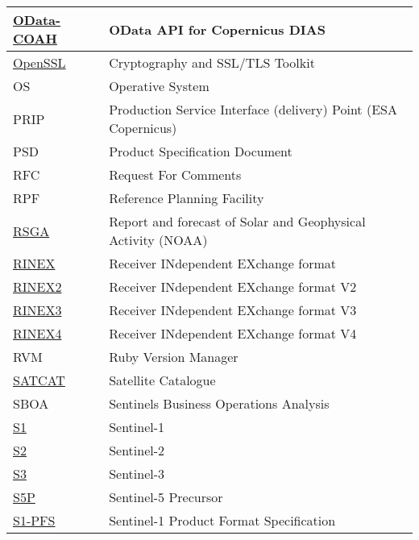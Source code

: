 \documentclass[dec_sum_main.tex]{subfiles}
\begin{document}
\begin{longtable}{|m{2.8cm}|m{10cm}|}
    \href{https://scihub.copernicus.eu/twiki/do/view/SciHubUserGuide/ODataAPI?redirectedfrom=SciHubUserGuide.7ODataAPI}{OData-COAH} & OData API for Copernicus DIAS \\ \hline
    \href{https://wiki.openssl.org/index.php/Main_Page}{OpenSSL} & Cryptography and SSL/TLS Toolkit \\ \hline    
	OS & Operative System \\ \hline
	PRIP & Production Service Interface (delivery) Point (ESA Copernicus) \\ \hline
    PSD & Product Specification Document \\ \hline
	RFC & Request For Comments \\ \hline
	RPF & Reference Planning Facility \\ \hline
	\href{https://www.swpc.noaa.gov/products/solar-and-geophysical-activity-summary}{RSGA} & Report and forecast of Solar and Geophysical Activity  (NOAA)\\ \hline
	\href{https://www.igs.org/wg/rinex/#documents-formats}{RINEX} & Receiver INdependent EXchange format \\ \hline
	\href{https://files.igs.org/pub/data/format/rinex211.txt}{RINEX2} & Receiver INdependent EXchange format V2 \\ \hline
	\href{https://files.igs.org/pub/data/format/rinex305.pdf}{RINEX3} & Receiver INdependent EXchange format V3 \\ \hline
	\href{https://files.igs.org/pub/data/format/rinex_4.00.pdf}{RINEX4} & Receiver INdependent EXchange format V4 \\ \hline	
	RVM & Ruby Version Manager \\ \hline
    \href{https://celestrak.com/satcat/search.php}{SATCAT} & Satellite Catalogue \\ \hline
    SBOA & Sentinels Business Operations Analysis \\ \hline
	\href{https://sentinels.copernicus.eu/web/sentinel/missions/sentinel-1}{S1} & Sentinel-1 \\ \hline
	\href{https://sentinels.copernicus.eu/web/sentinel/missions/sentinel-2}{S2} & Sentinel-2 \\ \hline
	\href{https://sentinels.copernicus.eu/web/sentinel/missions/sentinel-3}{S3} & Sentinel-3 \\ \hline
    \href{https://sentinels.copernicus.eu/web/sentinel/missions/sentinel-5p}{S5P} & Sentinel-5 Precursor \\ \hline
	\href{https://sentinels.copernicus.eu/documents/247904/1877131/S1-RS-MDA-52-7441-3-9-2_Sentinel-1ProductSpecification.pdf/4f4488ef-60ad-52cb-160c-71ebdf6ca820?t=1641274625444}{S1-PFS} & Sentinel-1 Product Format Specification\\ \hline

\end{longtable}
\end{document}
